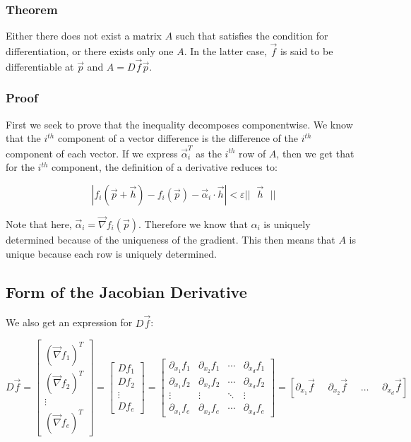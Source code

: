 \documentclass [12 pt, twoside] {book}
\newcommand\+{\text{ }}
\newcommand{\gradient}{\vec{\nabla}}
\begin{document}
\subsubsection{Theorem}

Either there does not exist a matrix $A$ such that satisfies the condition for
differentiation, or  there exists only one $A$. In the latter case, $\vec{f}$ is
said to be differentiable at $\vec{p}$ and $A = D\vec{f}\vec{p}$.

\subsubsection{Proof}

First we seek to prove that the inequality decomposes componentwise. We know
that the $i^{th}$ component of a vector difference is the difference of the
$i^{th}$ component of each vector. If we express $\vec{\alpha}_i^T$ as the
$i^{th}$ row of $A$, then we get that for the $i^{th}$ component,
the definition of a derivative reduces to:

$$|f_i(\vec{p} + \vec{h}) - f_i(\vec{p}) - \vec{\alpha}_i \cdot \vec{h}| <
\varepsilon ||\+\vec{h}\+||$$

Note that here, $\vec{\alpha}_i = \gradient f_i(\vec{p})$. Therefore we know
that $\alpha_i$ is uniquely determined because of the uniqueness of the
gradient. This then means that $A$ is unique because each row is uniquely
determined.

\subsection{Form of the Jacobian Derivative}

We also get an expression for $D\vec{f}$:

\[
    D\vec{f} = \left[\begin{array}{c}
    (\gradient f_1)^T\\
    (\gradient f_2)^T\\
    \vdots\\
    (\gradient f_e)^T
    \end{array}\right] = \left[
        \begin{array}{c}
            Df_1 \\
            Df_2 \\
            \vdots\\
            Df_e
        \end{array}
    \right] = 
    \left[\begin{array}{cccc}
            \partial_{x_1} f_1 & \partial_{x_2} f_1 & \cdots &
            \partial_{x_d} f_1\\
            \partial_{x_1} f_2 & \partial_{x_2} f_2 & \cdots &
            \partial_{x_d} f_2\\
            \vdots & \vdots & \ddots & \vdots\\
            \partial_{x_1} f_e & \partial_{x_2} f_e & \cdots &
            \partial_{x_d} f_e
    \end{array}\right] =
    [\partial_{x_1} \vec{f} \+\+ \partial_{x_2} \vec{f} \+\+ \dots \+\+ \partial_{x_d}
    \vec{f}]
\]
\end{document}
